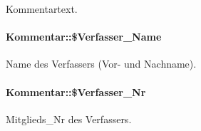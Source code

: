 Kommentartext. 

\hypertarget{classKommentar_84f0fc10295968adde28169f8df018d9}{
\paragraph[\$Verfasser\_\-Name]{\setlength{\rightskip}{0pt plus 5cm}Kommentar::\$Verfasser\_\-Name}\hfill}
\label{classKommentar_84f0fc10295968adde28169f8df018d9}


Name des Verfassers (Vor- und Nachname). 

\hypertarget{classKommentar_c92b002e40690ee052fec446ff2a0ef6}{
\paragraph[\$Verfasser\_\-Nr]{\setlength{\rightskip}{0pt plus 5cm}Kommentar::\$Verfasser\_\-Nr}\hfill}
\label{classKommentar_c92b002e40690ee052fec446ff2a0ef6}


Mitglieds\_\-Nr des Verfassers. 

